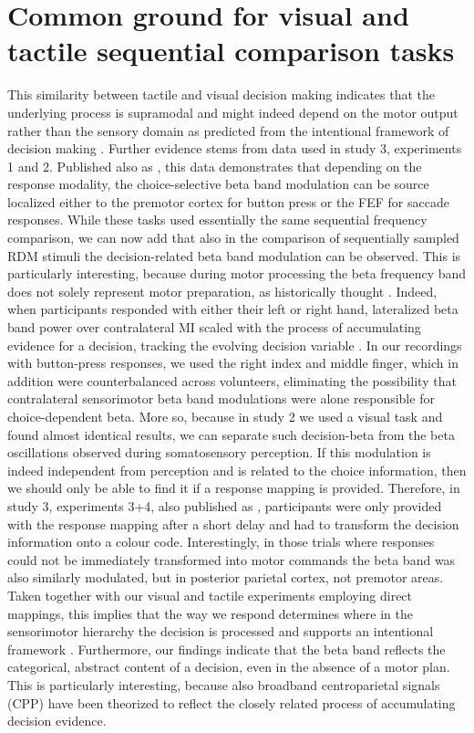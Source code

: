 \section{Common ground for visual and tactile sequential comparison tasks}
This similarity between tactile and visual decision making indicates that the underlying process is supramodal and might indeed depend on the motor output rather than the sensory domain as predicted from the intentional framework of decision making \parencite{Shadlen2008}. Further evidence stems from data used in study 3, experiments 1 and 2. Published also as \textcite{Herding2016,Herding2017}, this data demonstrates that depending on the response modality, the choice-selective beta band modulation can be source localized either to the premotor cortex for button press or the FEF for saccade responses. While these tasks used essentially the same sequential frequency comparison, we can now add that also in the comparison of sequentially sampled RDM stimuli the decision-related beta band modulation can be observed. This is particularly interesting, because during motor processing the beta frequency band does not solely represent motor preparation, as historically thought \parencite{Pfurtscheller1981}. Indeed, when participants responded with either their left or right hand, lateralized beta band power over contralateral MI scaled with the process of accumulating evidence for a decision, tracking the evolving decision variable \parencite{Donner2009,OConnell2012}. In our recordings with button-press responses, we used the right index and middle finger, which in addition were counterbalanced across volunteers, eliminating the possibility that contralateral sensorimotor beta band modulations were alone responsible for choice-dependent beta. More so, because in study 2 we used a visual task and found almost identical results, we can separate such decision-beta from the beta oscillations observed during somatosensory perception. If this modulation is indeed independent from perception and is related to the choice information, then we should only be able to find it if a response mapping is provided. Therefore, in study 3, experiments 3+4, also published as \textcite{Ludwig2018}, participants were only provided with the response mapping after a short delay and had to transform the decision information onto a colour code. Interestingly, in those trials where responses could not be immediately transformed into motor commands the beta band was also similarly modulated, but in posterior parietal cortex, not premotor areas. Taken together with our visual and tactile experiments employing direct mappings, this implies that the way we respond determines where in the sensorimotor hierarchy the decision is processed and supports an intentional framework \parencite{Shadlen2008}. Furthermore, our findings indicate that the beta band reflects the categorical, abstract content of a decision, even in the absence of a motor plan. This is particularly interesting, because also broadband centroparietal signals (CPP) have been theorized to reflect the closely related process of accumulating decision evidence.


